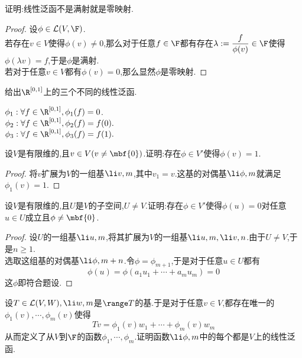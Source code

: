 \documentclass{ctexart}
\begin{document}
\pagestyle{empty}
\begin{center}
    \large{}
\end{center}
\begin{problem}[1.]
    证明:线性泛函不是满射就是零映射.
\end{problem}
\begin{proof}
    设$\phi\in\mathcal{L}(V,\F)$.\\
    若存在$v\in V$使得$\phi(v)\neq 0$,那么对于任意$f\in\F$都有存在$\lambda:=\dfrac{f}{\phi(v)}\in\F$使得$\phi(\lambda v)=f$,于是$\phi$是满射.\\
    若对于任意$v\in V$都有$\phi(v)=0$,那么显然$\phi$是零映射.
\end{proof}
\begin{problem}[2.]
    给出$\R^{[0,1]}$上的三个不同的线性泛函.
\end{problem}
\begin{solution}[Solution.]
    $\phi_1:\forall f\in\R^{[0,1]},\phi_1(f)=0$.\\
    $\phi_2:\forall f\in\R^{[0,1]},\phi_2(f)=f(0).$\\
    $\phi_3:\forall f\in\R^{[0,1]},\phi_3(f)=f(1).$
\end{solution}
\begin{problem}[3.]
    设$V$是有限维的,且$v\in V(v\neq\mbf{0})$.证明:存在$\phi\in V'$使得$\phi(v)=1$.
\end{problem}
\begin{proof}
    将$v$扩展为$V$的一组基$\li v,m$,其中$v_1=v$.这基的对偶基$\li \phi,m$就满足$\phi_1(v)=1$.
\end{proof}
\begin{problem}[4.]
    设$V$是有限维的,且$U$是$V$的子空间,$U\neq V$.证明:存在$\phi\in V'$使得$\phi(u)=0$对任意$u\in U$成立且$\phi\neq\mbf{0}$.
\end{problem}
\begin{proof}
    设$U$的一组基$\li u,m$,将其扩展为$V$的一组基$\li u,m,\li v,n$.由于$U\neq V$,于是$n\geqslant 1$.\\
    选取这组基的对偶基$\li\phi,{m+n}$.令$\phi=\phi_{m+1}$,于是对于任意$u\in U$都有
    $$\phi(u)=\phi(a_1u_1+\cdots+a_mu_m)=0$$
    这$\phi$即符合题设.
\end{proof}
\begin{problem}[5.]
    设$T\in\mathcal{L}(V,W),\li w,m$是$\range T$的基.于是对于任意$v\in V$,都存在唯一的$\phi_1(v),\cdots,\phi_m(v)$使得
    $$Tv=\phi_1(v)w_1+\cdots+\phi_m(v)w_m$$
    从而定义了从$V$到$\F$的函数$\phi_1,\cdots,\phi_m$.证明函数$\li\phi,m$中的每个都是$V$上的线性泛函.
\end{problem}
\end{document}
